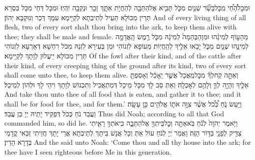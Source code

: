 {וּמִכׇּל\maqqaf הָ֠חַ֠י מִֽכׇּל\maqqaf בָּשָׂ֞ר שְׁנַ֧יִם מִכֹּ֛ל תָּבִ֥יא אֶל\maqqaf הַתֵּבָ֖ה לְהַחֲיֹ֣ת אִתָּ֑ךְ זָכָ֥ר וּנְקֵבָ֖ה יִֽהְיֽוּ׃}
{וּמִכָּל דְּחַי מִכָּל בִּסְרָא תְּרֵין מִכּוֹלָא תַּעֵיל לְתֵיבְתָא לְקַיָּימָא עִמָּךְ דְּכַר וְנוּקְבָּא יְהוֹן׃}
{And of every living thing of all flesh, two of every sort shalt thou bring into the ark, to keep them alive with thee; they shall be male and female.}{}
{מֵהָע֣וֹף לְמִינֵ֗הוּ וּמִן\maqqaf הַבְּהֵמָה֙ לְמִינָ֔הּ מִכֹּ֛ל רֶ֥מֶשׂ הָֽאֲדָמָ֖ה לְמִינֵ֑הוּ שְׁנַ֧יִם מִכֹּ֛ל יָבֹ֥אוּ אֵלֶ֖יךָ לְהַֽחֲיֽוֹת׃}
{מֵעוֹפָא לִזְנוֹהִי וּמִן בְּעִירָא לִזְנַהּ מִכֹּל רִחְשָׁא דְּאַרְעָא לִזְנוֹהִי תְּרֵין מִכּוֹלָא יֵיעֲלוּן לְוָתָךְ לְקַיָּימָא׃}
{Of the fowl after their kind, and of the cattle after their kind, of every creeping thing of the ground after its kind, two of every sort shall come unto thee, to keep them alive.}{}
{וְאַתָּ֣ה קַח\maqqaf לְךָ֗ מִכׇּל\maqqaf מַֽאֲכָל֙ אֲשֶׁ֣ר יֵֽאָכֵ֔ל וְאָסַפְתָּ֖ אֵלֶ֑יךָ וְהָיָ֥ה לְךָ֛ וְלָהֶ֖ם לְאׇכְלָֽה׃}
{וְאַתְּ סַב לָךְ מִכָּל מֵיכָל דְּמִתְאֲכִיל וְתִכְנוֹשׁ לְוָתָךְ וִיהֵי לָךְ וּלְהוֹן לְמֵיכַל׃}
{And take thou unto thee of all food that is eaten, and gather it to thee; and it shall be for food for thee, and for them.’}{}
{וַיַּ֖עַשׂ נֹ֑חַ כְּ֠כֹ֠ל אֲשֶׁ֨ר צִוָּ֥ה אֹת֛וֹ אֱלֹהִ֖ים כֵּ֥ן עָשָֽׂה׃}
{וַעֲבַד נֹחַ כְּכֹל דְּפַקֵּיד יָתֵיהּ יְיָ כֵּן עֲבַד׃}
{Thus did Noah; according to all that God commanded him, so did he.}{}
\newperek
{}%
{וַיֹּ֤אמֶר יְהֹוָה֙ לְנֹ֔חַ בֹּֽא\maqqaf אַתָּ֥ה וְכׇל\maqqaf בֵּיתְךָ֖ אֶל\maqqaf הַתֵּבָ֑ה כִּֽי\maqqaf אֹתְךָ֥ רָאִ֛יתִי צַדִּ֥יק לְפָנַ֖י בַּדּ֥וֹר הַזֶּֽה׃}
{וַאֲמַר יְיָ לְנֹחַ עוֹל אַתְּ וְכָל אֲנָשׁ בֵּיתָךְ לְתֵיבְתָא אֲרֵי יָתָךְ חֲזֵיתִי זַכַּאי קֳדָמַי בְּדָרָא הָדֵין׃}
{And the \lord\space said unto Noah: ‘Come thou and all thy house into the ark; for thee have I seen righteous before Me in this generation.}{}
